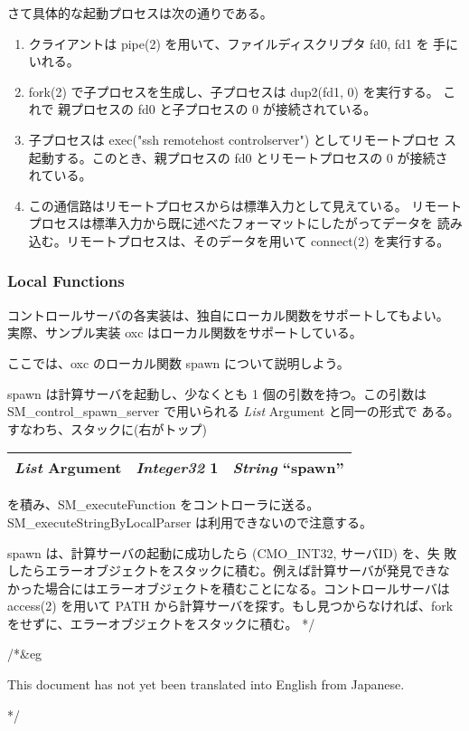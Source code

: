 \documentclass{article}
\begin{document}
さて具体的な起動プロセスは次の通りである。

\begin{enumerate}
\item 
クライアントは pipe(2) を用いて、ファイルディスクリプタ fd0, fd1 を
手にいれる。
\item
fork(2) で子プロセスを生成し、子プロセスは dup2(fd1, 0) を実行する。
これで 親プロセスの fd0 と子プロセスの 0 が接続されている。
\item
子プロセスは exec("ssh remotehost controlserver") としてリモートプロセ
ス起動する。このとき、親プロセスの fd0 とリモートプロセスの 0 が接続さ
れている。
\item
この通信路はリモートプロセスからは標準入力として見えている。
リモートプロセスは標準入力から既に述べたフォーマットにしたがってデータを
読み込む。リモートプロセスは、そのデータを用いて connect(2) を実行する。
\end{enumerate}


\subsubsection{Local Functions}

コントロールサーバの各実装は、独自にローカル関数をサポートしてもよい。
実際、サンプル実装 oxc はローカル関数をサポートしている。

ここでは、oxc のローカル関数 spawn について説明しよう。

spawn は計算サーバを起動し、少なくとも 1 個の引数を持つ。この引数は
SM\_control\_spawn\_server で用いられる {\sl List} Argument と同一の形式で
ある。すなわち、スタックに(右がトップ)
\begin{tabular}{|c|c|c|}  \hline
{\sl List} Argument & {\sl Integer32} 1 & {\sl String} ``spawn'' \\
\hline
\end{tabular}
を積み、SM\_executeFunction をコントローラに送る。
SM\_executeStringByLocalParser は利用できないので注意する。

spawn は、計算サーバの起動に成功したら (CMO\_INT32, サーバID) を、失
敗したらエラーオブジェクトをスタックに積む。例えば計算サーバが発見できな
かった場合にはエラーオブジェクトを積むことになる。コントロールサーバは 
access(2) を用いて PATH から計算サーバを探す。もし見つからなければ、fork 
をせずに、エラーオブジェクトをスタックに積む。
*/

/*&eg

This document has not yet been translated into English from Japanese.

*/
\end{document}
